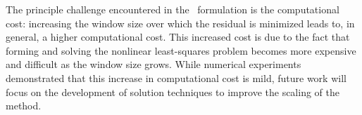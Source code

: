 \documentclass[3p,computermodern,10pt]{elsarticle}
\begin{document}
 
The principle challenge encountered in the \methodAcronym\ formulation is the computational cost: increasing the window size over which the residual is minimized leads to, in general, a higher computational cost. This increased cost is due to the fact that forming and solving the nonlinear least-squares problem becomes more expensive and difficult as the window size grows. While numerical experiments demonstrated that this increase in computational cost is mild, future work will focus on the development of solution techniques to improve the scaling of the method.

 


\end{document}
